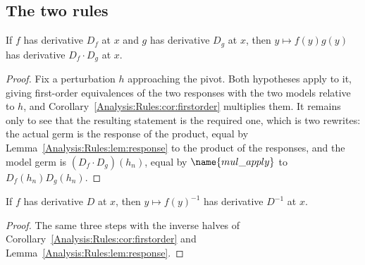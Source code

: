 \subsection{The two rules}

\begin{theorem}\label{Analysis:Rules:thm:product}
If $f$ has derivative $D_f$ at $x$ and $g$ has derivative $D_g$ at $x$, then
$y \mapsto f(y)g(y)$ has derivative $D_f \cdot D_g$ at $x$.
\end{theorem}

\begin{proof}
Fix a perturbation $h$ approaching the pivot.  Both hypotheses apply to it,
giving first-order equivalences of the two responses with the two models
relative to $h$, and Corollary~\ref{Analysis:Rules:cor:firstorder} multiplies
them.  It remains only to see that the resulting statement is the required one,
which is two rewrites: the actual germ is the response of the product, equal by
Lemma~\ref{Analysis:Rules:lem:response} to the product of the responses, and
the model germ is $(D_f \cdot D_g)(h_n)$, equal by $\name{mul\_apply}$ to
$D_f(h_n) D_g(h_n)$.
\end{proof}

\begin{theorem}\label{Analysis:Rules:thm:inverse}
If $f$ has derivative $D$ at $x$, then $y \mapsto f(y)^{-1}$ has derivative
$D^{-1}$ at $x$.
\end{theorem}

\begin{proof}
The same three steps with the inverse halves of
Corollary~\ref{Analysis:Rules:cor:firstorder} and
Lemma~\ref{Analysis:Rules:lem:response}.
\end{proof}

